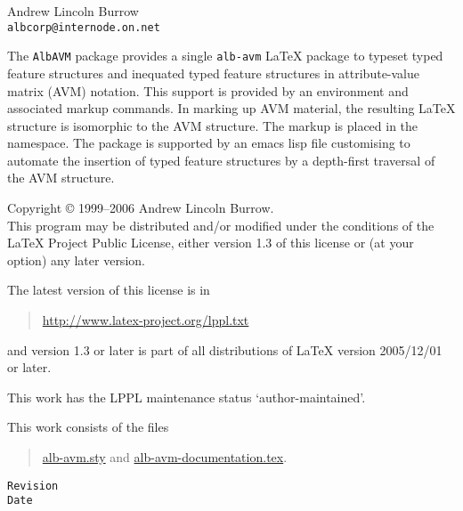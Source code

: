 \documentclass[11pt,a4paper,oneside,titlepage]{alb-corp}
\begin{document}


\begin{albTitlePage}


  Andrew Lincoln Burrow\\
  \texttt{albcorp@internode.on.net}



  The \texttt{AlbAVM} package provides a single \texttt{alb-avm}
  \LaTeX{} package to typeset typed feature structures and inequated
  typed feature structures in attribute-value matrix (AVM) notation.
  This support is provided by an environment and associated markup
  commands.  In marking up AVM material, the resulting \LaTeX{}
  structure is isomorphic to the AVM structure.  The markup is placed in
  the \albLogo{} namespace.  The package is supported by an emacs lisp
  file customising \AUCTeX{} to automate the insertion of typed feature
  structures by a depth-first traversal of the AVM structure.



  Copyright \copyright{} 1999--2006 Andrew Lincoln Burrow.\\
  This program may be distributed and/or modified under the conditions
  of the \LaTeX{} Project Public License, either version 1.3 of this
  license or (at your option) any later version.

  \medskip{}

  The latest version of this license is in
  \begin{quote}
    \url{http://www.latex-project.org/lppl.txt}
  \end{quote}
  and version 1.3 or later is part of all distributions of LaTeX version
  2005/12/01 or later.

  \medskip{}

  This work has the LPPL maintenance status `author-maintained'.

  \medskip{}

  This work consists of the files
  \begin{quote}
    \begin{flushleft}
      \url{alb-avm.sty} and
      \url{alb-avm-documentation.tex}.
    \end{flushleft}
  \end{quote}



  \verb$Revision$\\
  \verb$Date$

\end{albTitlePage}
\end{document}
